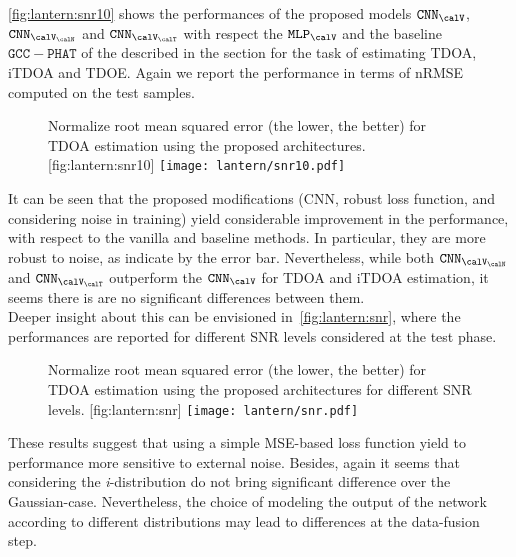 \mynewline
\cref{fig:lantern:snr10} shows the performances of the proposed models $\mathtt{CNN}_{\calV}$, $\mathtt{CNN}_{\calV_\calN}$ and $\mathtt{CNN}_{\calV_\calT}$ with respect the
$\mathtt{MLP}_{\calV}$ and the baseline $\mathtt{GCC-PHAT}$ of the described in the section for the task of estimating \ac{TDOA}, \ac{iTDOA} and \ac{TDOE}.
Again we report the performance in terms of \ac{nRMSE} computed on the test samples.
\begin{figure}[h]
    \begin{sidecaption}[]{%
        Normalize root mean squared error (the lower, the better) for \ac{TDOA} estimation using the proposed architectures.
    }[fig:lantern:snr10]
    \centering
    \texttt{[image: lantern/snr10.pdf]}
    \end{sidecaption}
\end{figure}
It can be seen that the proposed modifications (\ac{CNN}, robust loss function, and considering noise in training) yield considerable improvement in the performance, with respect to the vanilla and baseline methods.
In particular, they are more robust to noise, as indicate by the error bar.
Nevertheless, while both $\mathtt{CNN}_{\calV_\calN}$ and $\mathtt{CNN}_{\calV_\calT}$ outperform the $\mathtt{CNN}_{\calV}$ for \ac{TDOA} and \ac{iTDOA} estimation, it seems there is are no significant differences between them.
\\Deeper insight about this can be envisioned in~\cref{fig:lantern:snr}, where the performances are reported for different \ac{SNR} levels considered at the test phase.
\begin{figure}[h]
    \begin{sidecaption}[]{%
        Normalize root mean squared error (the lower, the better) for \ac{TDOA} estimation using the proposed architectures for different \ac{SNR} levels.
    }[fig:lantern:snr]
    \centering
    \texttt{[image: lantern/snr.pdf]}
    \end{sidecaption}
\end{figure}
These results suggest that using a simple \ac{MSE}-based loss function yield to performance more sensitive to external noise.
Besides, again it seems that considering the \textit{i}-distribution do not bring significant difference over the Gaussian-case.
Nevertheless, the choice of modeling the output of the network according to different distributions may lead to differences at the data-fusion step.

